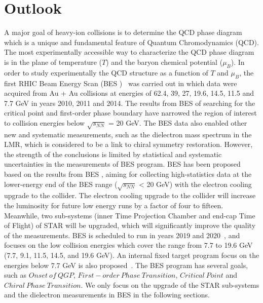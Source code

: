 \section{Outlook}
A major goal of heavy-ion collisions is to determine the QCD phase diagram which is a unique and fundamental feature of Quantum Chromodynamics (QCD). The most experimentally accessible way to characterize the QCD phase diagram is in the plane of temperature ($T$) and the baryon chemical potential ($\mu_{B}$). In order to study experimentally the QCD structure as a function of $T$ and $\mu_{B}$, the first RHIC Beam Energy Scan (BES \uppercase\expandafter{})~\cite{BESI} was carried out in which data were acquired from Au + Au collisions at energies of 62.4, 39, 27, 19.6, 14.5, 11.5 and 7.7 GeV in years 2010, 2011 and 2014. The results from BES \uppercase\expandafter{} of searching for the critical point and first-order phase boundary have narrowed the region of interest to collision energies below $\sqrt{s_{NN}}$ = 20 GeV. The BES \uppercase\expandafter{} data also enabled other new and systematic measurements, such as the dielectron mass spectrum in the LMR, which is considered to be a link to chiral symmetry restoration. However, the strength of the conclusions is limited by statistical and systematic uncertainties in the measurements of BES \uppercase\expandafter{} program. BES \uppercase\expandafter{} has been proposed based on the results from BES \uppercase\expandafter{}, aiming for collecting high-statistics data at the lower-energy end of the BES \uppercase\expandafter{} range ($\sqrt{s_{NN}}$ < 20 GeV) with the electron cooling~\cite{ecooling} upgrade to the collider. The electron cooling upgrade to the collider will increase the luminosity for future low energy runs by a factor of four to fifteen. Meanwhile, two sub-systems (inner Time Projection Chamber and end-cap Time of Flight) of STAR will be upgraded, which will significantly improve the quality of the measurements. BES \uppercase\expandafter{} is scheduled to run in years 2019 and 2020~\cite{BESII}, and focuses on the low collision energies which cover the range from 7.7 to 19.6 GeV (7.7, 9.1, 11.5, 14.5, and 19.6 GeV). An internal fixed target program focus on the energies below 7.7 GeV is also proposed~\cite{FixedTarget}. The BES \uppercase\expandafter{} program has several goals, such as $Onset~of~QGP$, $First-order~Phase~Transition$, $Critical~Point$ and $Chiral~Phase~Transition$. We only focus on the upgrade of the STAR sub-systems and the dielectron measurements in BES \uppercase\expandafter{} in the following sections. 

